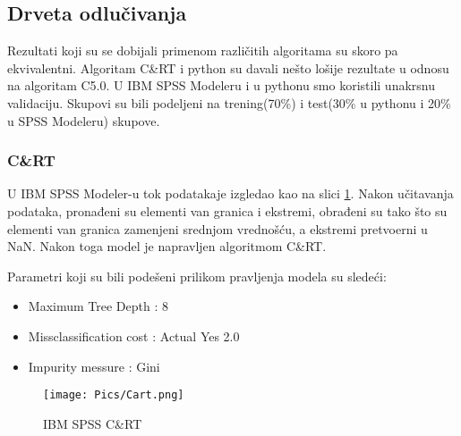 \documentclass[a4paper]{article}
\begin{document}
\subsection{Drveta odlučivanja}
\label{sec:DT}
Rezultati koji su se dobijali primenom različitih algoritama su skoro pa ekvivalentni.
Algoritam C\&RT i python su davali nešto lošije rezultate u odnosu na
algoritam C5.0. U IBM SPSS Modeleru i u pythonu smo koristili unakrsnu
validaciju. Skupovi su bili podeljeni na trening(70\%) i test(30\% u pythonu i 20\% u SPSS Modeleru) skupove.\par

\subsubsection{C\&RT}
\label{subsubsec:CART}
U IBM SPSS Modeler-u tok podatakaje izgledao kao na slici \ref{fig:cart-spss}. Nakon učitavanja podataka, pronađeni su elementi van granica i ekstremi, obrađeni su tako što su elementi van granica zamenjeni srednjom vrednošću, a ekstremi pretvoerni u NaN. Nakon toga model je napravljen algoritmom C\&RT.\par Parametri koji su bili podešeni prilikom pravljenja modela su sledeći:
\begin{itemize}
    \item Maximum Tree Depth : 8
    \item Missclassification cost : Actual Yes 2.0
    \item Impurity messure : Gini
\end{itemize}
\par

\begin{figure}[H]
     \centering
     \texttt{[image: Pics/Cart.png]}
     \caption{IBM SPSS C\&RT}
     \label{fig:cart-spss}
\end{figure}
\end{document}
